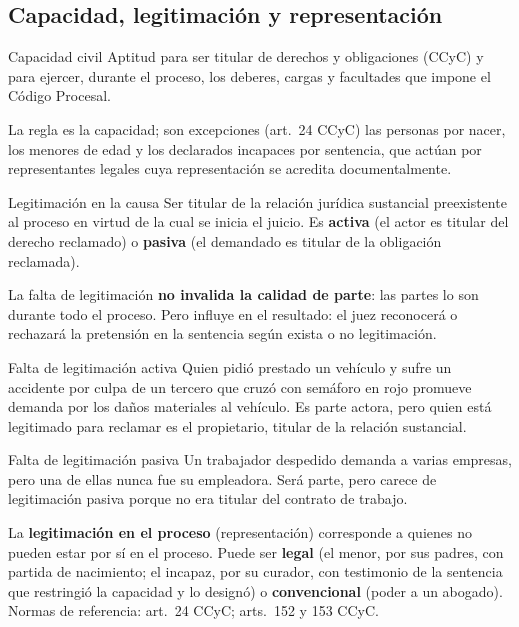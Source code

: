 \documentclass[12pt,oneside]{book}
\begin{document}
\subsection{Capacidad, legitimación y representación}

\begin{definition}{Capacidad civil}
Aptitud para ser titular de derechos y obligaciones (CCyC) y para ejercer, durante el proceso, los deberes, cargas y facultades que impone el Código Procesal.
\end{definition}

La regla es la capacidad; son excepciones (art.~24 CCyC) las personas por nacer, los menores de edad y los declarados incapaces por sentencia, que actúan por representantes legales cuya representación se acredita documentalmente.

\begin{definition}{Legitimación en la causa}
Ser titular de la relación jurídica sustancial preexistente al proceso en virtud de la cual se inicia el juicio. Es \textbf{activa} (el actor es titular del derecho reclamado) o \textbf{pasiva} (el demandado es titular de la obligación reclamada).
\end{definition}

\begin{important}
La falta de legitimación \textbf{no invalida la calidad de parte}: las partes lo son durante todo el proceso. Pero influye en el resultado: el juez reconocerá o rechazará la pretensión en la sentencia según exista o no legitimación.
\end{important}

\begin{example}{Falta de legitimación activa}
Quien pidió prestado un vehículo y sufre un accidente por culpa de un tercero que cruzó con semáforo en rojo promueve demanda por los daños materiales al vehículo. Es parte actora, pero quien está legitimado para reclamar es el propietario, titular de la relación sustancial.
\end{example}

\begin{example}{Falta de legitimación pasiva}
Un trabajador despedido demanda a varias empresas, pero una de ellas nunca fue su empleadora. Será parte, pero carece de legitimación pasiva porque no era titular del contrato de trabajo.
\end{example}

La \textbf{legitimación en el proceso} (representación) corresponde a quienes no pueden estar por sí en el proceso. Puede ser \textbf{legal} (el menor, por sus padres, con partida de nacimiento; el incapaz, por su curador, con testimonio de la sentencia que restringió la capacidad y lo designó) o \textbf{convencional} (poder a un abogado). Normas de referencia: art.~24 CCyC; arts.~152 y 153 CCyC.
\end{document}
